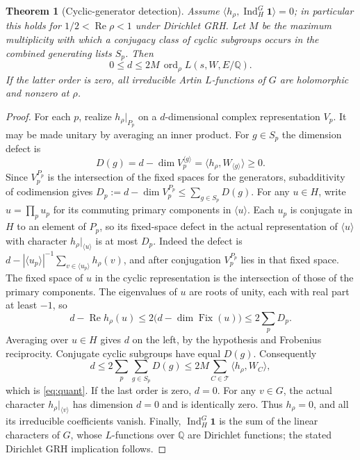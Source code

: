 \documentclass[11pt]{article}
\newtheorem{theorem}{Theorem}[section]
\theoremstyle{remark}\newtheorem{remark}[theorem]{Remark}
\DeclareMathOperator{\ord}{ord}
\DeclareMathOperator{\Ind}{Ind}
\DeclareMathOperator{\Fix}{Fix}
\DeclareMathOperator{\Ree}{Re}
\newcommand{\Q}{\mathbb Q}
\newcommand{\one}{\mathbf 1}
\begin{document}
\begin{theorem}[Cyclic-generator detection]\label{thm:det}
Assume $\langle h_\rho,\Ind_H^G\one\rangle=0$; in particular this
holds for $1/2<\Ree\rho<1$ under Dirichlet GRH. Let $M$ be the maximum
multiplicity with which a conjugacy class of cyclic subgroups occurs
in the combined generating lists $S_p$. Then
\begin{equation}\label{eq:quant}
 0\le d\le 2M\,\ord_\rho L(s,W,E/\Q).
\end{equation}
If the latter order is zero, all irreducible Artin $L$-functions of
$G$ are holomorphic and nonzero at $\rho$.
\end{theorem}
\begin{proof}
For each $p$, realize $h_\rho|_{P_p}$ on a $d$-dimensional complex
representation $V_p$. It may be made unitary by averaging an inner
product. For $g\in S_p$ the dimension defect is
\[
 D(g)=d-\dim V_p^{\langle g\rangle}
 =\langle h_\rho,W_{\langle g\rangle}\rangle\ge0.
\]
Since $V_p^{P_p}$ is the intersection of the fixed spaces for the
generators, subadditivity of codimension gives
$D_p:=d-\dim V_p^{P_p}\le\sum_{g\in S_p}D(g)$.
For any $u\in H$, write $u=\prod_p u_p$ for its commuting primary
components in $\langle u\rangle$. Each $u_p$ is conjugate in $H$ to
an element of $P_p$, so its fixed-space defect in the actual
representation of $\langle u\rangle$ with character
$h_\rho|_{\langle u\rangle}$ is at most $D_p$. Indeed the defect is
$d- |\langle u_p\rangle|^{-1}\sum_{v\in\langle u_p\rangle} h_\rho(v)$,
and after conjugation $V_p^{P_p}$ lies in that fixed space. The fixed
space of $u$ in the cyclic representation is the intersection of
those of the primary components. The eigenvalues of $u$ are roots
of unity, each with real part at least $-1$, so
\[
 d-\Ree h_\rho(u)\le 2\bigl(d-\dim\Fix(u)\bigr)
 \le 2\sum_p D_p.
\]
Averaging over $u\in H$ gives $d$ on the left, by the hypothesis and
Frobenius reciprocity. Conjugate cyclic subgroups have equal $D(g)$.
Consequently
\[
 d\le 2\sum_p\sum_{g\in S_p}D(g)
 \le 2M\sum_{C\in\mathcal T}\langle h_\rho,W_C\rangle,
\]
which is \eqref{eq:quant}. If the last order is zero, $d=0$. For any
$v\in G$, the actual character $h_\rho|_{\langle v\rangle}$ has
dimension $d=0$ and is identically zero. Thus $h_\rho=0$, and all its
irreducible coefficients vanish. Finally, $\Ind_H^G\one$ is the sum
of the linear characters of $G$, whose $L$-functions over $\Q$ are
Dirichlet functions; the stated Dirichlet GRH implication follows.
\end{proof}
\end{document}
